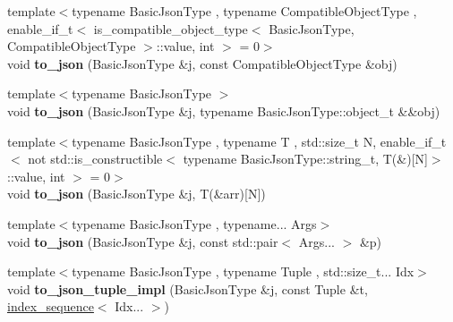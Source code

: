 \begin{DoxyCompactItemize}
\item 
{\footnotesize template$<$typename Basic\+Json\+Type , typename Compatible\+Object\+Type , enable\+\_\+if\+\_\+t$<$ is\+\_\+compatible\+\_\+object\+\_\+type$<$ Basic\+Json\+Type, Compatible\+Object\+Type $>$\+::value, int $>$  = 0$>$ }\\void {\bfseries to\+\_\+json} (Basic\+Json\+Type \&j, const Compatible\+Object\+Type \&obj)\hypertarget{namespacenlohmann_1_1detail_a24c9c12f3839c94e09532f08de85e949}{}\label{namespacenlohmann_1_1detail_a24c9c12f3839c94e09532f08de85e949}

\item 
{\footnotesize template$<$typename Basic\+Json\+Type $>$ }\\void {\bfseries to\+\_\+json} (Basic\+Json\+Type \&j, typename Basic\+Json\+Type\+::object\+\_\+t \&\&obj)\hypertarget{namespacenlohmann_1_1detail_ac9f7a5542851c61d93740148eaec509f}{}\label{namespacenlohmann_1_1detail_ac9f7a5542851c61d93740148eaec509f}

\item 
{\footnotesize template$<$typename Basic\+Json\+Type , typename T , std\+::size\+\_\+t N, enable\+\_\+if\+\_\+t$<$ not std\+::is\+\_\+constructible$<$ typename Basic\+Json\+Type\+::string\+\_\+t, T(\&)\mbox{[}\+N\mbox{]}$>$\+::value, int $>$  = 0$>$ }\\void {\bfseries to\+\_\+json} (Basic\+Json\+Type \&j, T(\&arr)\mbox{[}N\mbox{]})\hypertarget{namespacenlohmann_1_1detail_a8c4d301fc51996e3c5c1257fb92ace20}{}\label{namespacenlohmann_1_1detail_a8c4d301fc51996e3c5c1257fb92ace20}

\item 
{\footnotesize template$<$typename Basic\+Json\+Type , typename... Args$>$ }\\void {\bfseries to\+\_\+json} (Basic\+Json\+Type \&j, const std\+::pair$<$ Args... $>$ \&p)\hypertarget{namespacenlohmann_1_1detail_aa30611f74062379d3420c40487cf3bb3}{}\label{namespacenlohmann_1_1detail_aa30611f74062379d3420c40487cf3bb3}

\item 
{\footnotesize template$<$typename Basic\+Json\+Type , typename Tuple , std\+::size\+\_\+t... Idx$>$ }\\void {\bfseries to\+\_\+json\+\_\+tuple\+\_\+impl} (Basic\+Json\+Type \&j, const Tuple \&t, \hyperlink{structnlohmann_1_1detail_1_1index__sequence}{index\+\_\+sequence}$<$ Idx... $>$)\hypertarget{namespacenlohmann_1_1detail_a510dfa15b01e9a8afe31600a27b28199}{}\label{namespacenlohmann_1_1detail_a510dfa15b01e9a8afe31600a27b28199}


\end{DoxyCompactItemize}
